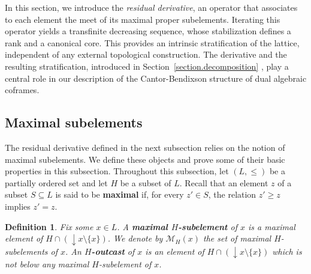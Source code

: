 \documentclass{article}
\newcommand{\blue}{\color{blue}}
\newtheorem{definition}[theorem]{Definition}
\begin{document}
In this section, we introduce the \textit{residual derivative}, an operator that associates to each element the meet of its maximal proper subelements. %
Iterating this operator yields a transfinite decreasing sequence, whose stabilization defines a rank and a canonical core. This provides an intrinsic stratification of the lattice, independent of any external topological construction. The derivative and the resulting stratification, introduced in Section~\ref{section.decomposition} , %
play a central role in our description of the Cantor-Bendixson structure of dual algebraic coframes. 



\subsection{Maximal subelements\label{section.def.max.subelements}}
{The residual derivative defined in the next subsection relies on the notion of maximal subelements. We define these objects and prove some of their basic properties in this subsection.}
Throughout this subsection, let $(L,\le)$ be a partially ordered set and let $H$ be a subset of $L$. Recall that an element $z$ of a subset $S\subseteq L$ is said to be \textbf{maximal} if, for every $z' \in S$, the relation $z' \ge z$ implies $z' = z$.

{
\begin{definition}
Fix some \(x\in L\). A \textbf{maximal \(H\)-subelement} of \(x\) is a maximal element of \(H\cap(\mathop{\downarrow}x\setminus\{x\})\). We denote by \(\mathcal{M}_H(x)\) the set of maximal \(H\)-subelements of \(x\). An \textbf{\(H\)-outcast} of \(x\) is an element of \( H\cap(\mathop{\downarrow}x\setminus\{x\})\) which is not below any maximal \(H\)-subelement of \(x\).
\end{definition}}
\end{document}

